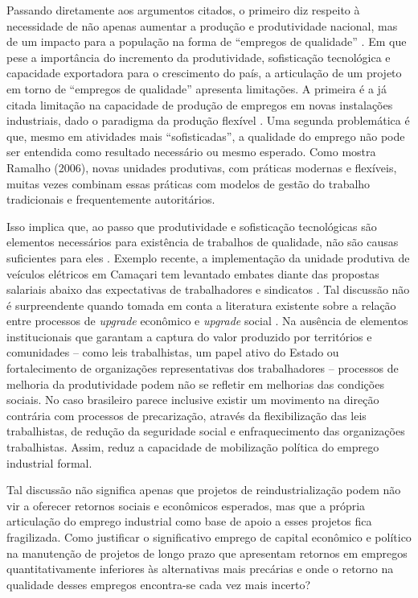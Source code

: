 Passando diretamente aos argumentos citados, o primeiro diz respeito à
necessidade de não apenas aumentar a produção e produtividade nacional,
mas de um impacto para a população na forma de ``empregos de qualidade''
\citep{cndi_nova_2024}. Em que pese a importância do incremento da
produtividade, sofisticação tecnológica e capacidade exportadora para o
crescimento do país, a articulação de um projeto em torno de ``empregos
de qualidade'' apresenta limitações. A primeira é a já citada limitação
na capacidade de produção de empregos em novas instalações industriais,
dado o paradigma da produção flexível . Uma segunda
problemática é que, mesmo em atividades mais ``sofisticadas'', a
qualidade do emprego não pode ser entendida como resultado necessário ou
mesmo esperado. Como mostra Ramalho (2006), novas unidades produtivas,
com práticas modernas e flexíveis, muitas vezes combinam essas práticas
com modelos de gestão do trabalho tradicionais e frequentemente
autoritários.

Isso implica que, ao passo que produtividade e sofisticação tecnológicas
são elementos necessários para existência de trabalhos de qualidade, não
são causas suficientes para eles . Exemplo recente, a
implementação da unidade produtiva de veículos elétricos em Camaçari tem
levantado embates diante das propostas salariais abaixo das expectativas
de trabalhadores e sindicatos . Tal discussão não é
surpreendente quando tomada em conta a literatura existente sobre a
relação entre processos de \emph{upgrade} econômico e \emph{upgrade}
social . Na ausência de elementos
institucionais que garantam a captura do valor produzido por territórios
e comunidades -- como leis trabalhistas, um papel ativo do Estado ou
fortalecimento de organizações representativas dos trabalhadores --
processos de melhoria da produtividade podem não se refletir em
melhorias das condições sociais. No caso brasileiro parece inclusive
existir um movimento na direção contrária com processos de precarização,
através da flexibilização das leis trabalhistas, de redução da
seguridade social e enfraquecimento das organizações trabalhistas.
Assim, reduz a capacidade de mobilização política do emprego industrial
formal.

Tal discussão não significa apenas que projetos de reindustrialização
podem não vir a oferecer retornos sociais e econômicos esperados, mas
que a própria articulação do emprego industrial como base de apoio a
esses projetos fica fragilizada. Como justificar o significativo emprego
de capital econômico e político na manutenção de projetos de longo prazo
que apresentam retornos em empregos quantitativamente inferiores às
alternativas mais precárias e onde o retorno na qualidade desses
empregos encontra-se cada vez mais incerto?

